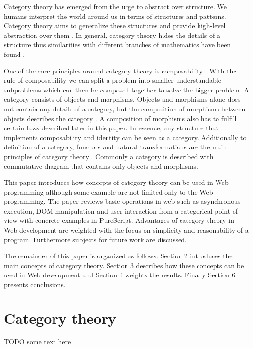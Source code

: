\documentclass[article]{aaltoseries}
\begin{document}
  Category theory has emerged from the urge to abstract over structure. We
  humans interpret the world around us in terms of structures and patterns.
  Category theory aims to generalize these structures and provide high-level
  abstraction over them \cite{eilenberg1945general}. In general, category theory
  hides the details of a structure thus similarities with different branches of
  mathematics have been found \cite{lawvere1996adjointness}.

  One of the core principles around category theory is composability
  \cite{barr1990category}. With the rule of composability we can split a problem
  into smaller understandable subproblems which can then be composed together to
  solve the bigger problem. A category consists of objects and morphisms.
  Objects and morphisms alone does not contain any details of a category, but
  the composition of morphisms between objects describes the category
  \cite{computational, barr1990category}. A composition of morphisms also has to
  fulfill certain laws described later in this paper. In essence, any structure
  that implements composability and identity can be seen as a category.
  Additionally to definition of a category, functors and natural transformations
  are the main principles of category theory \cite{awodey2006category,
    computational}. Commonly a category is described with commutative diagram
  that contains only objects and morphisms.
 
  This paper introduces how concepts of category theory can be used in Web
  programming although some example are not limited only to the Web programming.
  The paper reviews basic operations in web such as asynchronous execution, DOM
  manipulation and user interaction from a categorical point of view with
  concrete examples in PureScript. Advantages of category theory in Web
  development are weighted with the focus on simplicity and reasonability of a
  program. Furthermore subjects for future work are discussed.
 
  The remainder of this paper is organized as follows. Section 2 introduces the
  main concepts of category theory. Section 3 describes how these concepts can
  be used in Web development and Section 4 weights the results. Finally Section
  6 presents conclusions.


\section{Category theory}
TODO some text here
\end{document}
